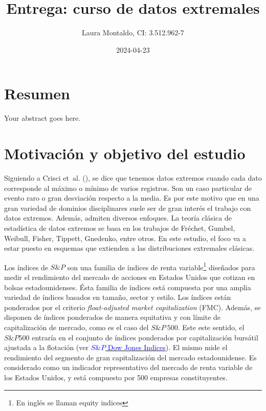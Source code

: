 \documentclass[
  12pt]{article}
\title{Entrega: curso de datos extremales}
\author{Laura Montaldo, CI: 3.512.962-7}
\date{2024-04-23}
\begin{document}
\maketitle

\newtheorem{theorem}{Teorema}
\newtheorem{mydefinition}{Definición}
\newtheorem{observation}{Observación}
\newtheorem{Corolario}{Corolario}

\newpage

\thispagestyle{empty}

\maketitle

\newpage

\tableofcontents

\newpage

\section{Resumen}\label{resumen}

Your abstract goes here.

\newpage

\section{Motivación y objetivo del estudio} \label{sec:motivacion}

Siguiendo a Crisci et~al. (), se dice
que tenemos datos extremos cuando cada dato corresponde al máximo o
mínimo de varios registros. Son un caso particular de evento raro o gran
desviación respecto a la media. Es por este motivo que en una gran
variedad de dominios disciplinares suele ser de gran interés el trabajo
con datos extremos. Además, admiten diversos enfoques. La teoría clásica
de estadística de datos extremos se basa en los trabajos de Fréchet,
Gumbel, Weibull, Fisher, Tippett, Gnedenko, entre otros. En este
estudio, el foco va a estar puesto en esquemas que extienden a las
distribuciones extremales clásicas.

Los índices de \(S\&P\) son una familia de índices de renta
variable\footnote{En inglés se llaman equity indices} diseñados para
medir el rendimiento del mercado de acciones en Estados Unidos que
cotizan en bolsas estadounidenses. Ésta familia de índices está
compuesta por una amplia variedad de índices basados en tamaño, sector y
estilo. Los índices están ponderados por el criterio
\textit{float-adjusted market capitalization} (FMC). Además, se disponen
de índices ponderados de manera equitativa y con límite de
capitalización de mercado, como es el caso del \(S\&P\:500\). Este este
sentido, el \(S\&P 500\) entraría en el conjunto de índices ponderados
por capitalización bursátil ajustada a la flotación (ver
\href{http://www.overleaf.com}{\textcolor{blue}{$S\&P$ Dow Jones Indices}}).
El mismo mide el rendimiento del segmento de gran capitalización del
mercado estadounidense. Es considerado como un indicador representativo
del mercado de renta variable de los Estados Unidos, y está compuesto
por 500 empresas constituyentes.
\end{document}
